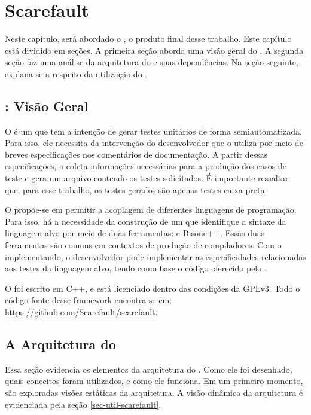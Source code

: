 \chapter[Scarefault]{Scarefault}
Neste capítulo, será abordado o \Scarefault, o produto final desse
trabalho. Este capítulo está dividido em seções. A primeira seção aborda
uma visão geral do \Scarefault. A segunda seção faz uma análise da
arquitetura do \framework e suas dependências. Na seção seguinte, explana-se
a respeito da utilização do \Scarefault.

\section{\Scarefault: Visão Geral}
O \scarefault é um \framework que tem a intenção de gerar testes unitários
de forma semiautomatizada. Para isso, ele necessita da intervenção do
desenvolvedor que o utiliza por meio de breves especificações nos
comentários de documentação. A partir dessas especificações, o \scarefault
coleta informações necessárias para a produção dos casos de teste e gera
um arquivo contendo os testes solicitados. É importante ressaltar que,
para esse trabalho, os testes gerados são apenas testes caixa preta.

O \framework propõe-se em permitir a acoplagem de diferentes linguagens
de programação. Para isso, há a necessidade da construção de um \parser
que identifique a sintaxe da linguagem alvo por meio de duas
ferramentas: \flexcpp e \textsf{Bisonc++}. Essas duas ferramentas são
comuns em contextos de produção de compiladores. Com o \parser
implementando, o desenvolvedor pode implementar as especificidades
relacionadas aos testes da linguagem alvo, tendo como base o código
oferecido pelo \Scarefault.

O \scarefault foi escrito em \textsf{C++}, e está licenciado dentro das condições
da \textsf{GPLv3}. Todo o código fonte desse framework encontra-se em:
\url{https://github.com/Scarefault/scarefault}.

\section{A Arquitetura do \scarefault} \label{sec-arq-scarefault}
Essa seção evidencia os elementos da arquitetura do \Scarefault. Como
ele foi desenhado, quais conceitos foram utilizados, e como ele funciona.
Em um primeiro momento, são exploradas visões estáticas da arquitetura.
A visão dinâmica da arquitetura é evidenciada pela seção \ref{sec-util-scarefault}.

